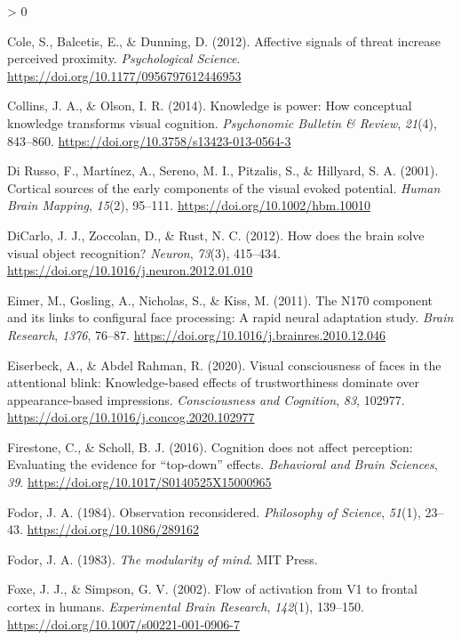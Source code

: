\documentclass[
  english,
  doc,12pt,twoside,floatsintext]{apa7}
\newlength{\cslhangindent}
\newenvironment{CSLReferences}[2] %
 {%
  \setlength{\parindent}{0pt}
  \ifodd #1 \everypar{\setlength{\hangindent}{\cslhangindent}}\ignorespaces\fi
  \ifnum #2 > 0
  \setlength{\parskip}{#2\baselineskip}
  \fi
 }%
 {}
\begin{document}
\begin{CSLReferences}{1}{0}
\leavevmode\hypertarget{ref-cole2012}{}%
Cole, S., Balcetis, E., \& Dunning, D. (2012). Affective signals of threat increase perceived proximity. \emph{Psychological Science}. \url{https://doi.org/10.1177/0956797612446953}

\leavevmode\hypertarget{ref-collins2014}{}%
Collins, J. A., \& Olson, I. R. (2014). Knowledge is power: How conceptual knowledge transforms visual cognition. \emph{Psychonomic Bulletin \& Review}, \emph{21}(4), 843--860. \url{https://doi.org/10.3758/s13423-013-0564-3}

\leavevmode\hypertarget{ref-dirusso2001}{}%
Di Russo, F., Martínez, A., Sereno, M. I., Pitzalis, S., \& Hillyard, S. A. (2001). Cortical sources of the early components of the visual evoked potential. \emph{Human Brain Mapping}, \emph{15}(2), 95--111. \url{https://doi.org/10.1002/hbm.10010}

\leavevmode\hypertarget{ref-dicarlo2012}{}%
DiCarlo, J. J., Zoccolan, D., \& Rust, N. C. (2012). How does the brain solve visual object recognition? \emph{Neuron}, \emph{73}(3), 415--434. \url{https://doi.org/10.1016/j.neuron.2012.01.010}

\leavevmode\hypertarget{ref-eimer2011}{}%
Eimer, M., Gosling, A., Nicholas, S., \& Kiss, M. (2011). The {N170} component and its links to configural face processing: A rapid neural adaptation study. \emph{Brain Research}, \emph{1376}, 76--87. \url{https://doi.org/10.1016/j.brainres.2010.12.046}

\leavevmode\hypertarget{ref-eiserbeck2020}{}%
Eiserbeck, A., \& Abdel Rahman, R. (2020). Visual consciousness of faces in the attentional blink: Knowledge-based effects of trustworthiness dominate over appearance-based impressions. \emph{Consciousness and Cognition}, \emph{83}, 102977. \url{https://doi.org/10.1016/j.concog.2020.102977}

\leavevmode\hypertarget{ref-firestone2016}{}%
Firestone, C., \& Scholl, B. J. (2016). Cognition does not affect perception: Evaluating the evidence for {``top-down''} effects. \emph{Behavioral and Brain Sciences}, \emph{39}. \url{https://doi.org/10.1017/S0140525X15000965}

\leavevmode\hypertarget{ref-fodor1984}{}%
Fodor, J. A. (1984). Observation reconsidered. \emph{Philosophy of Science}, \emph{51}(1), 23--43. \url{https://doi.org/10.1086/289162}

\leavevmode\hypertarget{ref-fodor1983}{}%
Fodor, J. A. (1983). \emph{The modularity of mind}. MIT Press.

\leavevmode\hypertarget{ref-foxe2002}{}%
Foxe, J. J., \& Simpson, G. V. (2002). Flow of activation from {V1} to frontal cortex in humans. \emph{Experimental Brain Research}, \emph{142}(1), 139--150. \url{https://doi.org/10.1007/s00221-001-0906-7}


\end{CSLReferences}
\end{document}
